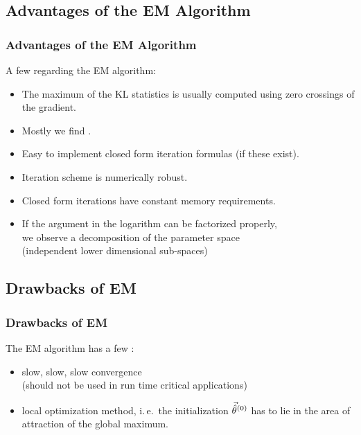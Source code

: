 \subsection{Advantages of the EM Algorithm}

\begin{frame}
  \frametitle{Advantages of the EM Algorithm}

  A few  regarding the EM algorithm:

  \begin{itemize}
    \item The maximum of the KL statistics is usually computed using zero crossings of the gradient. \\[.3cm] \pause 
    \item Mostly we find . \\[.3cm] \pause 
    \item Easy to implement closed form iteration formulas (if these exist). \\[.3cm] \pause 
    \item Iteration scheme is numerically robust. \\[.3cm] \pause 
    \item Closed form iterations have constant memory requirements. \\[.3cm] \pause 
    \item If the argument in the logarithm can be factorized properly, \\
      we observe a decomposition of the parameter space \\
      (independent lower dimensional sub-spaces)
  \end{itemize}
\end{frame}


\subsection{Drawbacks of EM}

\begin{frame}
  \frametitle{Drawbacks of EM}

  The EM algorithm has a few : \pause

  \begin{itemize}
    \item slow, slow, slow convergence \\
      (should not be used in run time critical applications) \pause 
    \item local optimization method, i.\,e.\ the initialization $\vec{\hat{\theta}}^{(0)}$ has to lie in the area of attraction of the global maximum.
  \end{itemize}

  \begin{center}
    \resizebox{.6\linewidth}{!}{
      
    }
  \end{center}
\end{frame}


